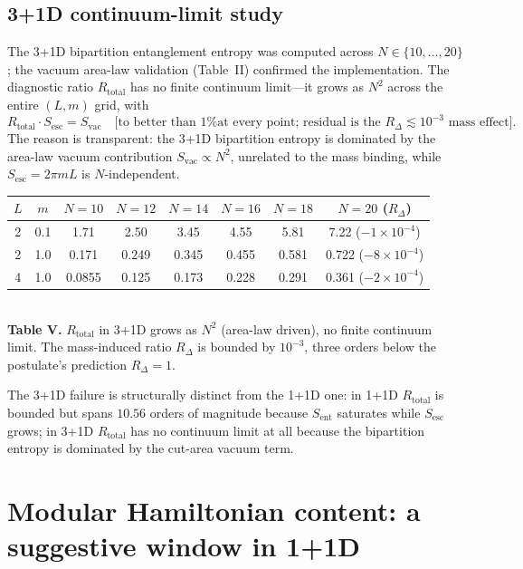 \documentclass[11pt]{article}
\newcommand{\Sesc}{S_{\mathrm{esc}}}
\newcommand{\Sent}{S_{\mathrm{ent}}}
\newcommand{\Svac}{S_{\mathrm{vac}}}
\newcommand{\Rtot}{R_{\mathrm{total}}}
\begin{document}
\subsection{3+1D continuum-limit study}
The 3+1D bipartition entanglement entropy was computed across $N \in \{10,\dots,20\}$; the vacuum
area-law validation (Table~II) confirmed the implementation. The diagnostic ratio $\Rtot$ has no finite
continuum limit---it grows as $N^{2}$ across the entire $(L,m)$ grid, with
\begin{equation}
  \Rtot\cdot\Sesc = \Svac
  \quad\text{[to better than 1\% at every point; residual is the $R_{\Delta}\lesssim 10^{-3}$ mass effect].}
\end{equation}
The reason is transparent: the 3+1D bipartition entropy is dominated by the area-law vacuum
contribution $\Svac \propto N^{2}$, unrelated to the mass binding, while $\Sesc = 2\pi m L$ is
$N$-independent.
\begin{center}
\begin{tabular}{cccccccc}
\toprule
$L$ & $m$ & $N=10$ & $N=12$ & $N=14$ & $N=16$ & $N=18$ & $N=20$ ($R_{\Delta}$) \\
\midrule
2 & 0.1 & 1.71 & 2.50 & 3.45 & 4.55 & 5.81 & 7.22 ($-1{\times}10^{-4}$) \\
2 & 1.0 & 0.171 & 0.249 & 0.345 & 0.455 & 0.581 & 0.722 ($-8{\times}10^{-4}$) \\
4 & 1.0 & 0.0855 & 0.125 & 0.173 & 0.228 & 0.291 & 0.361 ($-2{\times}10^{-4}$) \\
\bottomrule
\end{tabular}
\\[2pt]
{\small \textbf{Table V.} $\Rtot$ in 3+1D grows as $N^{2}$ (area-law driven), no finite continuum limit.
The mass-induced ratio $R_{\Delta}$ is bounded by $10^{-3}$, three orders below the postulate's
prediction $R_{\Delta}=1$.}
\end{center}
The 3+1D failure is structurally distinct from the 1+1D one: in 1+1D $\Rtot$ is bounded but spans
$10.56$ orders of magnitude because $\Sent$ saturates while $\Sesc$ grows; in 3+1D $\Rtot$ has no
continuum limit at all because the bipartition entropy is dominated by the cut-area vacuum term.

\section{Modular Hamiltonian content: a suggestive window in 1+1D}
\end{document}
